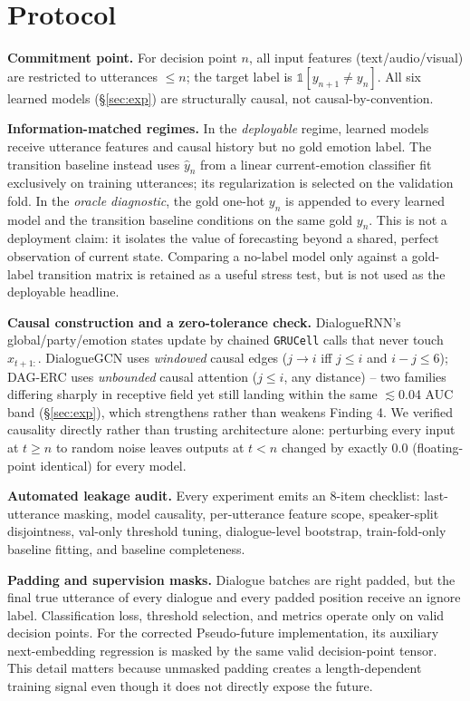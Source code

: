\documentclass{ieeeaccess}
\begin{document}
\section{Protocol}

\textbf{Commitment point.} For decision point $n$, all input features (text/audio/visual) are
restricted to utterances $\leq n$; the target label is $\mathbb{1}[y_{n+1} \neq y_n]$. All six
learned models (\S\ref{sec:exp}) are structurally causal, not causal-by-convention.

\textbf{Information-matched regimes.} In the \emph{deployable} regime, learned models receive
utterance features and causal history but no gold emotion label. The transition baseline instead
uses $\hat y_n$ from a linear current-emotion classifier fit exclusively on training utterances;
its regularization is selected on the validation fold. In the \emph{oracle diagnostic}, the gold
one-hot $y_n$ is appended to every learned model and the transition baseline conditions on the same
gold $y_n$. This is not a deployment claim: it isolates the value of forecasting beyond a shared,
perfect observation of current state. Comparing a no-label model only against a gold-label
transition matrix is retained as a useful stress test, but is not used as the deployable headline.

\textbf{Causal construction and a zero-tolerance check.} DialogueRNN's global/party/emotion states
update by chained \texttt{GRUCell} calls that never touch $x_{t+1:}$. DialogueGCN uses
\emph{windowed} causal edges ($j{\to}i$ iff $j\leq i$ and $i-j\leq 6$); DAG-ERC uses
\emph{unbounded} causal attention ($j\leq i$, any distance) -- two families differing sharply in
receptive field yet still landing within the same $\lesssim$0.04 AUC band (\S\ref{sec:exp}), which
strengthens rather than weakens Finding 4. We verified causality directly rather than trusting
architecture alone: perturbing every input at $t\geq n$ to random noise leaves outputs at $t<n$
changed by exactly 0.0 (floating-point identical) for every model.

\textbf{Automated leakage audit.} Every experiment emits an 8-item checklist: last-utterance
masking, model causality, per-utterance feature scope, speaker-split disjointness, val-only threshold
tuning, dialogue-level bootstrap, train-fold-only baseline fitting, and baseline completeness.

\textbf{Padding and supervision masks.} Dialogue batches are right padded, but the final true
utterance of every dialogue and every padded position receive an ignore label. Classification loss,
threshold selection, and metrics operate only on valid decision points. For the corrected
Pseudo-future implementation, its auxiliary next-embedding regression is masked by the same valid
decision-point tensor. This detail matters because unmasked padding creates a length-dependent
training signal even though it does not directly expose the future.
\end{document}
